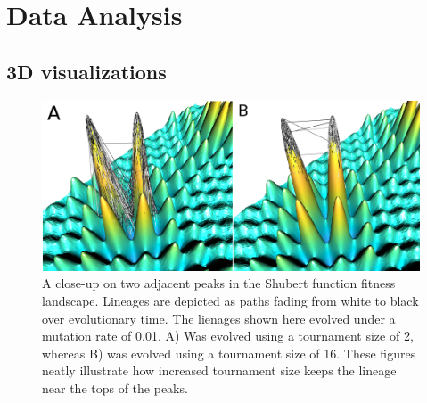 \documentclass[letterpaper]{article}
\newcommand{\reduceCaptionPadding}{\setlength{\belowcaptionskip}{-10pt}}
\begin{document}

\section{Data Analysis}
\subsection{3D visualizations}

\begin{figure}
\includegraphics[width=\columnwidth]{figs/shubert_landscape.png}
\reduceCaptionPadding
\caption{\small A close-up on two adjacent peaks in the Shubert function fitness landscape. Lineages are depicted as paths fading from white to black over evolutionary time. The lienages shown here evolved under a mutation rate of 0.01. A) Was evolved using a tournament size of 2, whereas B) was evolved using a tournament size of 16. These figures neatly illustrate how increased tournament size keeps the lineage near the tops of the peaks.}
\label{fig:lineageviz}
\end{figure}


\end{document}
